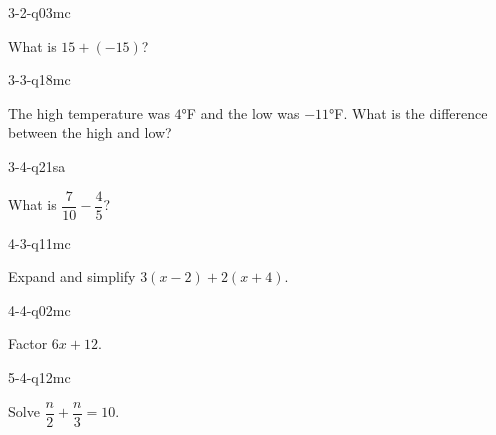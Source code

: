 \begin{practiceQuestion}{3-2-q03}{mc}
\begin{questionText}
What is $15 + (-15)$?
\end{questionText}
\end{practiceQuestion}

\begin{practiceQuestion}{3-3-q18}{mc}
\begin{questionText}
The high temperature was $4°$F and the low was $-11°$F. What is the difference between the high and low?
\end{questionText}
\end{practiceQuestion}

\begin{practiceQuestion}{3-4-q21}{sa}
\begin{questionText}
What is $\dfrac{7}{10} - \dfrac{4}{5}$?
\end{questionText}
\end{practiceQuestion}

\begin{practiceQuestion}{4-3-q11}{mc}
\begin{questionText}
Expand and simplify $3(x - 2) + 2(x + 4)$.
\end{questionText}
\end{practiceQuestion}

\begin{practiceQuestion}{4-4-q02}{mc}
\begin{questionText}
Factor $6x + 12$.
\end{questionText}
\end{practiceQuestion}

\begin{practiceQuestion}{5-4-q12}{mc}
\begin{questionText}
Solve $\dfrac{n}{2} + \dfrac{n}{3} = 10$.
\end{questionText}
\end{practiceQuestion}

